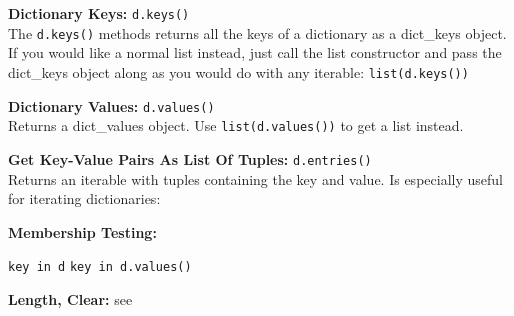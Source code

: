 \begin{indentblock}
        \textbf{Dictionary Keys:} \texttt{d.keys()} \\
        The \texttt{d.keys()} methods returns all the keys of a dictionary as a
        dict\_keys
        object. If you would like a normal list instead, just call the list constructor and pass
        the dict\_keys object along as you would do with any iterable:
        \texttt{list(d.keys())}

        \textbf{Dictionary Values:} \texttt{d.values()} \\
        Returns a dict\_values object. Use \texttt{list(d.values())} to get a list
        instead.

        \textbf{Get Key-Value Pairs As List Of Tuples:} \texttt{d.entries()} \\
        Returns an iterable with tuples containing the key and value.
        Is especially useful for iterating dictionaries:


        \textbf{Membership Testing:}
        \begin{itemize}
             \texttt{key in d}
             \texttt{key in d.values()}
        \end{itemize}

        \textbf{Length, Clear:} see 

    \end{indentblock}

